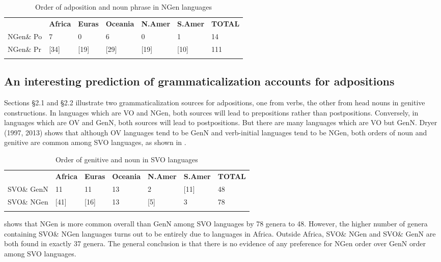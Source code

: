 \documentclass[output=paper]{langsci/langscibook}
\begin{document}
\begin{table}
\begin{tabularx}{\textwidth}{XXXXXXX} & \bfseries Africa & \bfseries Euras & \bfseries Oceania & \bfseries N.Amer & \bfseries S.Amer & \bfseries TOTAL\\
\lsptoprule
NGen\& Po & 7 & 0 & 6 & 0 & 1 & 14\\
NGen\& Pr & [34] & [19] & [29] & [19] & [10] & 111\\
\lspbottomrule
\end{tabularx}
\caption{\label{tab:dryer:4}Order of adposition and noun phrase in NGen languages}
\end{table}


\subsection{An interesting prediction of grammaticalization accounts for adpositions}


Sections §2.1 and §2.2 illustrate two grammaticalization sources for adpositions, one from verbs, the other from head nouns in genitive constructions. In languages which are VO and NGen, both sources will lead to prepositions rather than postpositions. Conversely, in languages which are OV and GenN, both sources will lead to postpositions. But there are many languages which are VO but GenN. Dryer (1997, 2013) shows that although OV languages tend to be GenN and verb-initial languages tend to be NGen, both orders of noun and genitive are common among SVO languages, as shown in .

\begin{table}
\begin{tabularx}{\textwidth}{XXXXXXX} 
\lsptoprule
& \bfseries Africa & \bfseries Euras & \bfseries Oceania & \bfseries N.Amer & \bfseries S.Amer & \bfseries TOTAL\\
SVO\& GenN & 11 & 11 & 13 & 2 & [11] & 48\\
SVO\& NGen & [41] & [16] & 13 & [5] & 3 & 78\\
\lspbottomrule
\end{tabularx}
\caption{\label{tab:dryer:5}Order of genitive and noun in SVO languages}
\end{table}


 shows that NGen is more common overall than GenN among SVO languages by 78 genera to 48. However, the higher number of genera containing SVO\& NGen languages turns out to be entirely due to languages in Africa. Outside Africa, SVO\& NGen and SVO\& GenN are both found in exactly 37 genera. The general conclusion is that there is no evidence of any preference for NGen order over GenN order among SVO languages.
\end{document}
